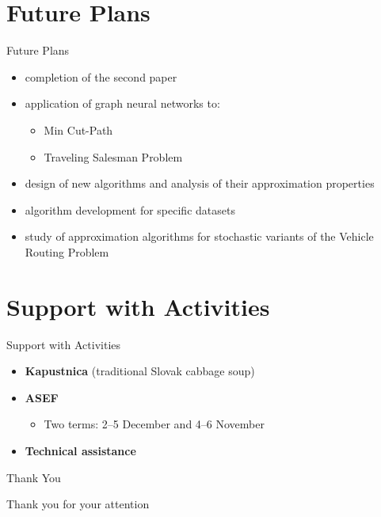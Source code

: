 \documentclass [xcolor=svgnames, t] {beamer}
\begin{document}
\section{Future Plans}
\begin{frame}{Future Plans}
\vspace{-0.6em}
\begin{itemize}
    \item completion of the second paper
    \item application of graph neural networks to:
    \begin{itemize}
        \item Min Cut-Path
        \item Traveling Salesman Problem
    \end{itemize}
    \item design of new algorithms and analysis of their approximation properties
    \item algorithm development for specific datasets
    \item study of approximation algorithms for stochastic variants of the Vehicle Routing Problem
\end{itemize}
\end{frame}

\section{Support with Activities}
\begin{frame}{Support with Activities}
\vspace{-0.6em}
\begin{itemize}
    \item \textbf{Kapustnica} (traditional Slovak cabbage soup)
    
    \item \textbf{ASEF}
    \begin{itemize}
        \item Two terms: 2--5 December and 4--6 November
    \end{itemize}
    
    \item \textbf{Technical assistance}
\end{itemize}
\end{frame}


\begin{frame}{Thank You}
\vspace{1.5em}
\begin{center}
    \Large Thank you for your attention
\end{center}
\end{frame}
\end{document}
